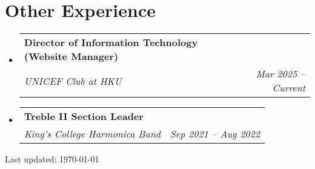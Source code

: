 \documentclass[a4paper,11pt]{article}
\makeatletter
\newcommand{\resumeSubheading}[4]{
  \vspace{-2pt}\item
    \begin{tabular*}{0.97\textwidth}[t]{@{}l@{\extracolsep{\fill}}r@{}}
      \raggedright\textbf{#3} & \small#2 \\ %
      \textit{\small#1} & \textit{\small#4} \\ 
    \end{tabular*}\vspace{-7pt}
}
\newcommand{\resumeSubHeadingListStart}{\begin{itemize}[leftmargin=0.15in, label={}, itemsep=1pt]}
\newcommand{\resumeSubHeadingListEnd}{\end{itemize}}
\makeatother
\begin{document}
\section{Other Experience}
  \resumeSubHeadingListStart
    \resumeSubheading
      {UNICEF Club at HKU}{}
      {Director of Information Technology (Website Manager)}{Mar 2025 -- Current}
    \resumeSubheading
      {King's College Harmonica Band}{}
      {Treble II Section Leader}{Sep 2021 -- Aug 2022}
  \resumeSubHeadingListEnd

\vfill
\begin{center}
\footnotesize
Last updated: \today
\end{center}
\end{document}
